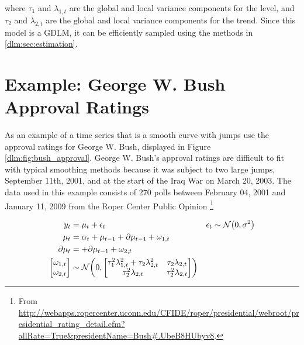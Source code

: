 where $\tau_{1}$ and $\lambda_{1,t}$ are the global and local variance components for the level, and $\tau_{2}$ and $\lambda_{2,t}$ are the global and local variance components for the trend.
Since this model is a GDLM, it can be efficiently sampled using the methods in \ref{dlm:sec:estimation}.


\section{Example: George W. Bush Approval Ratings}
\label{dlm:sec:george-w.-bush}

As an example of a time series that is a smooth curve with jumps \textcite{RatkovicEng2010} use the approval ratings for George W. Bush, displayed in Figure \ref{dlm:fig:bush_approval}.
George W. Bush's approval ratings are difficult to fit with typical smoothing methods because it was subject to two large jumps, September 11th, 2001, and at the start of the Iraq War on March 20, 2003.
The data used in this example consists of 270 polls between February 04, 2001 and January 11, 2009 from the Roper Center Public Opinion \footnote{From \url{http://webapps.ropercenter.uconn.edu/CFIDE/roper/presidential/webroot/presidential_rating_detail.cfm?allRate=True\&presidentName=Bush\#.UbeB8HUbyv8}.}

\begin{equation}
  \label{dlm:eq:30}
  \begin{aligned}[t]
    y_{t} &= \mu_{t} + \epsilon_{t} & \epsilon_{t} & \sim \mathcal{N}\mathopen{}\left(0, \sigma^{2}\right)\mathclose{} \\
    \mu_{t} &= \alpha_{t} +  \mu_{t - 1} + \partial \mu_{t - 1} + \omega_{1, t} \\
    \partial \mu_{t} &= + \partial \mu_{t - 1} + \omega_{2, t} \\
    \begin{bmatrix}
      \omega_{1, t} \\
      \omega_{2, t}
    \end{bmatrix} &
                    \sim \mathcal{N}\mathopen{}\left(0,
                    \begin{bmatrix}
                      \tau_{1}^{2} \lambda_{1, t}^{2} + \tau_{2} \lambda_{2, t}^{2} & \tau_{2} \lambda_{2, t} \\
                      \tau_{2}^{2} \lambda_{2, t} & \tau_{2}^{2} \lambda_{2, t}
                    \end{bmatrix}
                    \right)\mathclose{}
  \end{aligned}
\end{equation}


